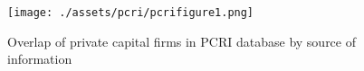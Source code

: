 
\begin{figure}[tb]
    \centering
\texttt{[image: ./assets/pcri/pcrifigure1.png]}
\caption{Overlap of private capital firms in PCRI database by source of information\label{fig:pcrifigure1}}
\end{figure}

